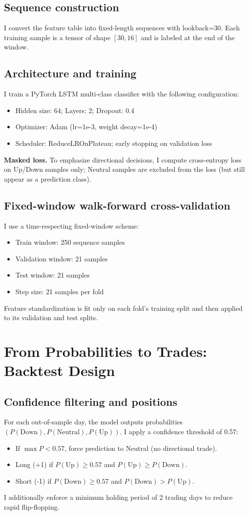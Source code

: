 \documentclass[letterpaper]{article} %
\begin{document}
\subsection{Sequence construction}
I convert the feature table into fixed-length sequences with lookback=30. Each training sample is a tensor of shape $[30,16]$ and is labeled at the end of the window.

\subsection{Architecture and training}
I train a PyTorch LSTM multi-class classifier with the following configuration:
\begin{itemize}
  \item Hidden size: 64; Layers: 2; Dropout: 0.4
  \item Optimizer: Adam (lr=1e-3, weight decay=1e-4)
  \item Scheduler: ReduceLROnPlateau; early stopping on validation loss
\end{itemize}
\textbf{Masked loss.} To emphasize directional decisions, I compute cross-entropy loss on Up/Down samples only; Neutral samples are excluded from the loss (but still appear as a prediction class).

\subsection{Fixed-window walk-forward cross-validation}
I use a time-respecting fixed-window scheme:
\begin{itemize}
  \item Train window: 250 sequence samples
  \item Validation window: 21 samples
  \item Test window: 21 samples
  \item Step size: 21 samples per fold
\end{itemize}
Feature standardization is fit only on each fold's training split and then applied to its validation and test splits.

\section{From Probabilities to Trades: Backtest Design}
\subsection{Confidence filtering and positions}
For each out-of-sample day, the model outputs probabilities $(P(\text{Down}),P(\text{Neutral}),P(\text{Up}))$. I apply a confidence threshold of 0.57:
\begin{itemize}
  \item If $\max P < 0.57$, force prediction to Neutral (no directional trade).
  \item Long (+1) if $P(\text{Up})\ge 0.57$ and $P(\text{Up})\ge P(\text{Down})$.
  \item Short (-1) if $P(\text{Down})\ge 0.57$ and $P(\text{Down})> P(\text{Up})$.
\end{itemize}
I additionally enforce a minimum holding period of 2 trading days to reduce rapid flip-flopping.
\end{document}
